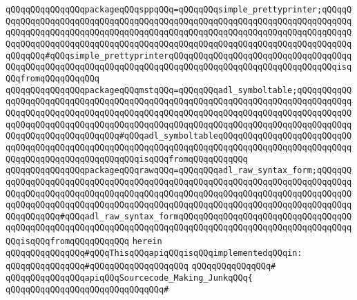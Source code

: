 \verb|qQQqqQQqqQQqqQQqpackageqQQqsppqQQq=qQQqqQQqsimple_prettyprinter;qQQqqQQqqQQqqQQqqQQqqQQqqQQqqQQqqQQqqQQqqQQqqQQqqQQqqQQqqQQqqQQqqQQqqQQqqQQqqQQqqQQqqQQqqQQqqQQqqQQqqQQqqQQqqQQqqQQqqQQqqQQqqQQqqQQqqQQqqQQqqQQqqQQqqQQqqQQqqQQqqQQqqQQqqQQqqQQqqQQqqQQqqQQqqQQqqQQqqQQqqQQqqQQqqQQqqQQqqQQqqQQq#qQQqsimple_prettyprinterqQQqqQQqqQQqqQQqqQQqqQQqqQQqqQQqqQQqqQQqqQQqqQQqqQQqqQQqqQQqqQQqqQQqqQQqqQQqqQQqqQQqqQQqqQQqqQQqqQQqqQQqisqQQqfromqQQqqQQqqQQq|\newline
\verb|qQQqqQQqqQQqqQQqpackageqQQqmstqQQq=qQQqqQQqadl_symboltable;qQQqqQQqqQQqqQQqqQQqqQQqqQQqqQQqqQQqqQQqqQQqqQQqqQQqqQQqqQQqqQQqqQQqqQQqqQQqqQQqqQQqqQQqqQQqqQQqqQQqqQQqqQQqqQQqqQQqqQQqqQQqqQQqqQQqqQQqqQQqqQQqqQQqqQQqqQQqqQQqqQQqqQQqqQQqqQQqqQQqqQQqqQQqqQQqqQQqqQQqqQQqqQQqqQQqqQQqqQQqqQQqqQQqqQQqqQQqqQQqqQQq#qQQqadl_symboltableqQQqqQQqqQQqqQQqqQQqqQQqqQQqqQQqqQQqqQQqqQQqqQQqqQQqqQQqqQQqqQQqqQQqqQQqqQQqqQQqqQQqqQQqqQQqqQQqqQQqqQQqqQQqqQQqqQQqqQQqqQQqisqQQqfromqQQqqQQqqQQq|\newline
\verb|qQQqqQQqqQQqqQQqpackageqQQqrawqQQq=qQQqqQQqadl_raw_syntax_form;qQQqqQQqqQQqqQQqqQQqqQQqqQQqqQQqqQQqqQQqqQQqqQQqqQQqqQQqqQQqqQQqqQQqqQQqqQQqqQQqqQQqqQQqqQQqqQQqqQQqqQQqqQQqqQQqqQQqqQQqqQQqqQQqqQQqqQQqqQQqqQQqqQQqqQQqqQQqqQQqqQQqqQQqqQQqqQQqqQQqqQQqqQQqqQQqqQQqqQQqqQQqqQQqqQQqqQQqqQQqqQQqqQQq#qQQqadl_raw_syntax_formqQQqqQQqqQQqqQQqqQQqqQQqqQQqqQQqqQQqqQQqqQQqqQQqqQQqqQQqqQQqqQQqqQQqqQQqqQQqqQQqqQQqqQQqqQQqqQQqqQQqqQQqqQQqisqQQqfromqQQqqQQqqQQq|\newline
\verb|herein|\newline
\newline
\verb|qQQqqQQqqQQqqQQq#qQQqThisqQQqapiqQQqisqQQqimplementedqQQqin:|\newline
\verb|qQQqqQQqqQQqqQQq#qQQqqQQqqQQqqQQqqQQq|\newline
\verb|qQQqqQQqqQQqqQQq#|\newline
\verb|qQQqqQQqqQQqqQQqapiqQQqSourcecode_Making_JunkqQQq{|\newline
\verb|qQQqqQQqqQQqqQQqqQQqqQQqqQQqqQQq#|\newline
